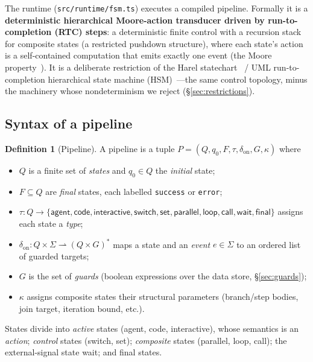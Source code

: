 \documentclass[11pt]{article}
\theoremstyle{plain}
\theoremstyle{definition}
\newtheorem{definition}[theorem]{Definition}
\theoremstyle{remark}
\newcommand{\code}[1]{\texttt{#1}}
\newcommand{\state}[1]{\textsf{#1}}
\begin{document}
The runtime (\code{src/runtime/fsm.ts}) executes a compiled pipeline. Formally it
is a \textbf{deterministic hierarchical Moore-action transducer driven by
run-to-completion (RTC) steps}: a deterministic finite control with a recursion
stack for composite states (a restricted pushdown structure), where each state's
action is a self-contained computation that emits exactly one event
(the Moore property~\cite{moore}). It is a
deliberate restriction of the Harel statechart~\cite{harel} / UML run-to-completion
hierarchical state machine (HSM)~\cite{uml,scxml}---the same
control topology, minus the machinery whose nondeterminism we reject
(\S\ref{sec:restrictions}).

\subsection{Syntax of a pipeline}

\begin{definition}[Pipeline]\label{def:pipeline}
A pipeline is a tuple $P = (Q, q_0, F, \tau, \delta_{\mathrm{on}}, G, \kappa)$ where
\begin{itemize}[nosep]
  \item $Q$ is a finite set of \emph{states} and $q_0 \in Q$ the \emph{initial} state;
  \item $F \subseteq Q$ are \emph{final} states, each labelled \code{success} or \code{error};
  \item $\tau : Q \to \{\state{agent}, \state{code}, \state{interactive}, \state{switch},
        \state{set}, \state{parallel}, \state{loop}, \state{call}, \state{wait}, \state{final}\}$
        assigns each state a \emph{type};
  \item $\delta_{\mathrm{on}} : Q \times \Sigma \rightharpoonup (Q \times G)^{*}$ maps a state and an
        \emph{event} $e \in \Sigma$ to an ordered list of guarded targets;
  \item $G$ is the set of \emph{guards} (boolean expressions over the data store, \S\ref{sec:guards});
  \item $\kappa$ assigns composite states their structural parameters (branch/step bodies, join target,
        iteration bound, etc.).
\end{itemize}
\end{definition}

States divide into \emph{active} states (\state{agent}, \state{code},
\state{interactive}), whose semantics is an \emph{action}; \emph{control} states
(\state{switch}, \state{set}); \emph{composite} states (\state{parallel},
\state{loop}, \state{call}); the external-signal state \state{wait}; and
\state{final} states.
\end{document}
